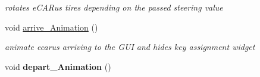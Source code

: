 \begin{DoxyCompactItemize}
\begin{DoxyCompactList}\small\item\em rotates e\+C\+A\+Rus\textquotesingle{} tires depending on the passed steering value \end{DoxyCompactList}\item 
\hypertarget{class_main_window_a0e5b89d0f15feab33a7c1fb56b398297}{}void \hyperlink{class_main_window_a0e5b89d0f15feab33a7c1fb56b398297}{arrive\+\_\+\+Animation} ()\label{class_main_window_a0e5b89d0f15feab33a7c1fb56b398297}

\begin{DoxyCompactList}\small\item\em animate ecarus\textquotesingle{} arriving to the G\+U\+I and hides key assignment widget \end{DoxyCompactList}\item 
\hypertarget{class_main_window_a0045f76b77a2fda750ce2bd30f8a0a59}{}void {\bfseries depart\+\_\+\+Animation} ()\label{class_main_window_a0045f76b77a2fda750ce2bd30f8a0a59}

\end{DoxyCompactItemize}
